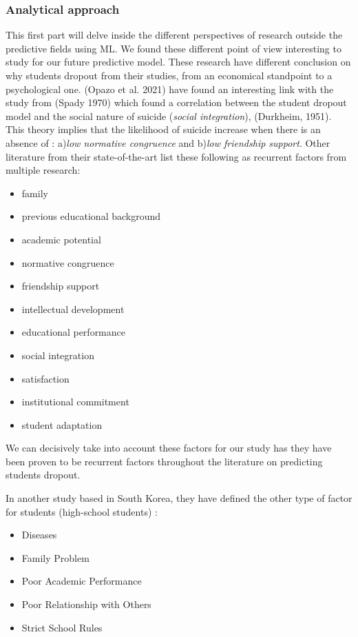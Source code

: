 \documentclass[conference]{IEEEtran}
\begin{document}
\subsubsection{Analytical approach}
\label{subsec:soa_analyticalapproeach}
This first part will delve inside the different perspectives of research outside the predictive fields using ML. We found these different point of view interesting to study for our future predictive model. These research have different conclusion on why students dropout from their studies, from an economical standpoint to a psychological one.
(Opazo et al. 2021)\cite{opazo_analysis_2021} have found an interesting link with the study from (Spady 1970) which found a correlation between the student dropout model and the social nature of suicide (\textit{social integration}), (Durkheim, 1951). This theory implies that the likelihood of suicide increase when there is an absence of : a)\textit{low normative congruence} and b)\textit{low friendship support}. Other literature from their state-of-the-art list these following as recurrent factors from multiple research\cite{opazo_analysis_2021}\cite{spady_dropouts_1970,tinto_dropout_1975,caspersen_teachers_2015,lidia_problema_2006,bejarano_caso_2017,sinchi_acceso_2018,cavero_voluntad_2011,velasco_alisis_nodate}: 
\begin{itemize}
    \item family
    \item previous educational background
    \item academic potential
    \item normative congruence
    \item friendship support
    \item intellectual development
    \item educational performance
    \item social integration
    \item satisfaction
    \item institutional commitment
    \item student adaptation
\end{itemize}
We can decisively take into account these factors for our study has they have been proven to be recurrent factors throughout the literature on predicting students dropout.

In another study based in South Korea, they have defined the other type of factor for students (high-school students) \cite{lee_machine_2019} :
\begin{itemize}
    \item Diseases
    \item Family Problem
    \item Poor Academic Performance
    \item Poor Relationship with Others
    \item Strict School Rules
\end{itemize}
\end{document}

